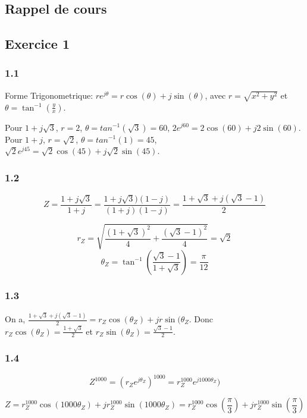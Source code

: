 \documentclass[]{book}
\theoremstyle{definition}
\begin{document}
\subsection*{Rappel de cours}



\newpage

\subsection*{Exercice 1}

\subsubsection*{1.1}
Forme Trigonometrique: $re^{j\theta} = r\cos(\theta) +j\sin(\theta)$, avec $r=\sqrt{x^2 + y^2}$ et $\theta = \tan^{-1}(\frac{y}{x})$.

Pour $1 + j\sqrt{3}$, $r = 2$, $\theta = tan^{-1}(\sqrt{3}) = 60$, $2e^{j60} = 2\cos(60) + j2\sin(60)$.\\
Pour $1 + j$, $r = \sqrt{2}$, $\theta = tan^{-1}(1) = 45$, $\sqrt{2}e^{j45} = \sqrt{2}\cos(45) + j\sqrt{2}\sin(45)$.


\subsubsection*{1.2}
$$Z=\frac{1+j\sqrt{3}}{1+j} = \frac{1+ j\sqrt{3})(1-j)}{(1+j)(1-j)} = \frac{1+\sqrt{3} + j(\sqrt{3}-1)}{2}$$

$$r_{Z} = \sqrt{\frac{(1+\sqrt{3})^2}{4} + \frac{(\sqrt{3}-1)^2}{4}} = \sqrt{2}$$
$$\theta_{Z} = \tan^{-1}(\frac{\sqrt{3}-1}{1+\sqrt{3}}) = \frac{\pi}{12}$$

\subsubsection*{1.3}
On a, $\frac{1+\sqrt{3} + j(\sqrt{3}-1)}{2} = r_{Z}\cos(\theta_{Z}) + jr\sin(\theta_{Z}$. Donc\\
$r_{Z}\cos(\theta_{Z}) = \frac{1+\sqrt{3}}{2}$ et $r_{Z}\sin(\theta_{Z}) = \frac{\sqrt{3}-1}{2}$.

\subsubsection*{1.4}
$$Z^{1000} = (r_{Z}e^{j\theta_{Z}})^{1000} = r_{Z}^{1000}e^{j1000\theta_{Z}})$$

$$Z=r_{Z}^{1000}\cos(1000\theta_{Z}) + jr_{Z}^{1000}\sin(1000\theta_{Z}) = r_{Z}^{1000}\cos(\frac{\pi}{3}) + jr_{Z}^{1000}\sin(\frac{\pi}{3})$$ 
\end{document}
